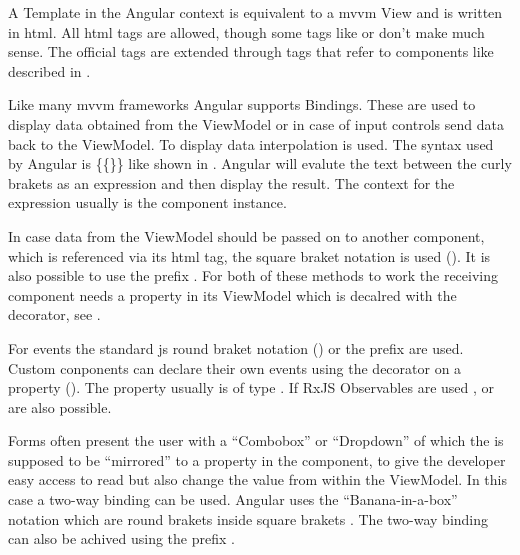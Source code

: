 A Template in the Angular context is equivalent to a \gls{mvvm} View and is written in \gls{html}. All \gls{html} tags are allowed, though some tags like  or  don't make much sense. The official tags are extended through tags that refer to components like described in .


Like many \gls{mvvm} frameworks Angular supports Bindings. These are used to display data obtained from the ViewModel or in case of input controls send data back to the ViewModel. To display data interpolation is used. The syntax used by Angular is \{\{\}\} like shown in . Angular will evalute the text between the curly brakets as an expression and then display the result. The context for the expression usually is the component instance.

In case data from the ViewModel should be passed on to another component, which is referenced via its \gls{html} tag, the square braket notation is used (). It is also possible to use the  prefix \zB {}. For both of these methods to work the receiving component needs a property in its ViewModel which is decalred with the  decorator, see .

For events the standard \gls{js} round braket notation () or the  prefix \zB {} are used. Custom conponents can declare their own events using the  decorator on a property (). The property usually is of type . If RxJS Observables are used , or  are also possible.

Forms often present the user with a \enquote{Combobox} or \enquote{Dropdown} of which the  is supposed to be \enquote{mirrored} to a property in the component, to give the developer easy access to read but also change the value from within the ViewModel. In this case a two-way binding can be used. Angular uses the \enquote{Banana-in-a-box} notation which are round brakets inside square brakets \zB {}. The two-way binding can also be achived using the  prefix \zB {}.

